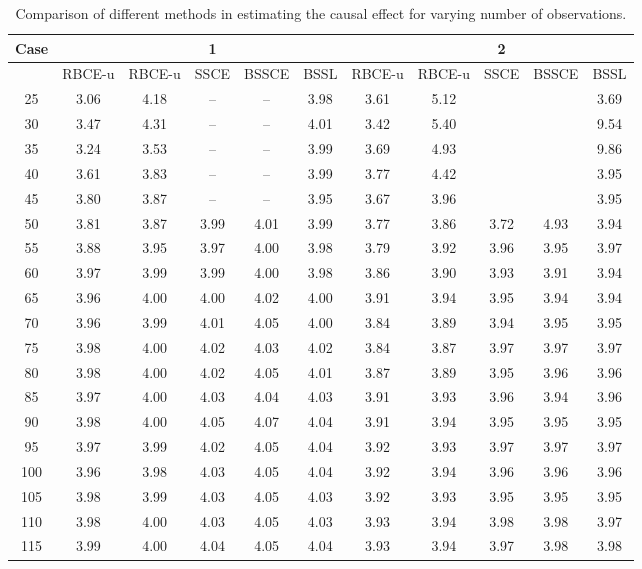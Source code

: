 \documentclass[preprint,12pt]{elsarticle}
\begin{document}
\begin{table}[ht]
\centering
\tiny
\caption{Comparison of different methods in estimating the causal effect for varying number of observations.}
\begin{tabular}{c|ccccc|ccccc}
  \hline
 Case&  &  & 1 &  &  &  &  & 2 &  &  \\ 
  \hline
 & RBCE-u & RBCE-u & SSCE & BSSCE & BSSL & RBCE-u & RBCE-u & SSCE & BSSCE & BSSL \\ 
  \hline
25 & 3.06 & 4.18 & -- & -- & 3.98 & 3.61 & 5.12 &  &  & 3.69 \\ 
  30 & 3.47 & 4.31 & -- & -- & 4.01 & 3.42 & 5.40 &  &  & 9.54 \\ 
  35 & 3.24 & 3.53 & -- & -- & 3.99 & 3.69 & 4.93 &  &  & 9.86 \\ 
  40 & 3.61 & 3.83 & -- & -- & 3.99 & 3.77 & 4.42 &  &  & 3.95 \\ 
  45 & 3.80 & 3.87 & -- & -- & 3.95 & 3.67 & 3.96 &  &  & 3.95 \\ 
  50 & 3.81 & 3.87 & 3.99 & 4.01 & 3.99 & 3.77 & 3.86 & 3.72 & 4.93 & 3.94 \\ 
  55 & 3.88 & 3.95 & 3.97 & 4.00 & 3.98 & 3.79 & 3.92 & 3.96 & 3.95 & 3.97 \\ 
  60 & 3.97 & 3.99 & 3.99 & 4.00 & 3.98 & 3.86 & 3.90 & 3.93 & 3.91 & 3.94 \\ 
  65 & 3.96 & 4.00 & 4.00 & 4.02 & 4.00 & 3.91 & 3.94 & 3.95 & 3.94 & 3.94 \\ 
  70 & 3.96 & 3.99 & 4.01 & 4.05 & 4.00 & 3.84 & 3.89 & 3.94 & 3.95 & 3.95 \\ 
  75 & 3.98 & 4.00 & 4.02 & 4.03 & 4.02 & 3.84 & 3.87 & 3.97 & 3.97 & 3.97 \\ 
  80 & 3.98 & 4.00 & 4.02 & 4.05 & 4.01 & 3.87 & 3.89 & 3.95 & 3.96 & 3.96 \\ 
  85 & 3.97 & 4.00 & 4.03 & 4.04 & 4.03 & 3.91 & 3.93 & 3.96 & 3.94 & 3.96 \\ 
  90 & 3.98 & 4.00 & 4.05 & 4.07 & 4.04 & 3.91 & 3.94 & 3.95 & 3.95 & 3.95 \\ 
  95 & 3.97 & 3.99 & 4.02 & 4.05 & 4.04 & 3.92 & 3.93 & 3.97 & 3.97 & 3.97 \\ 
  100 & 3.96 & 3.98 & 4.03 & 4.05 & 4.04 & 3.92 & 3.94 & 3.96 & 3.96 & 3.96 \\ 
  105 & 3.98 & 3.99 & 4.03 & 4.05 & 4.03 & 3.92 & 3.93 & 3.95 & 3.95 & 3.95 \\ 
  110 & 3.98 & 4.00 & 4.03 & 4.05 & 4.03 & 3.93 & 3.94 & 3.98 & 3.98 & 3.97 \\ 
  115 & 3.99 & 4.00 & 4.04 & 4.05 & 4.04 & 3.93 & 3.94 & 3.97 & 3.98 & 3.98 \\ 

\end{tabular}
\end{table}
\end{document}
